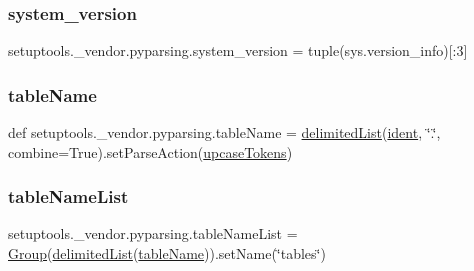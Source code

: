 \subsubsection{\texorpdfstring{system\+\_\+version}{system\_version}}
{\footnotesize\ttfamily setuptools.\+\_\+vendor.\+pyparsing.\+system\+\_\+version = tuple(sys.\+version\+\_\+info)\mbox{[}\+:3\mbox{]}}

\mbox{\label{namespacesetuptools_1_1__vendor_1_1pyparsing_a71a1a55915c50310d55220826e0ecf36}} 
\subsubsection{\texorpdfstring{table\+Name}{tableName}}
{\footnotesize\ttfamily def setuptools.\+\_\+vendor.\+pyparsing.\+table\+Name = \hyperlink{namespacesetuptools_1_1__vendor_1_1pyparsing_a1989367af98a82b6d6b4860de6b9f2f1}{delimited\+List}(\hyperlink{namespacesetuptools_1_1__vendor_1_1pyparsing_abc961dfe3e230ca908d9304d7786a03b}{ident}, \char`\"{}.\char`\"{}, combine=True).set\+Parse\+Action(\hyperlink{namespacesetuptools_1_1__vendor_1_1pyparsing_a9c65499f07d8593273a03109246a0065}{upcase\+Tokens})}

\mbox{\label{namespacesetuptools_1_1__vendor_1_1pyparsing_abf3681dc3179bcc2081feefd10f691e8}} 
\subsubsection{\texorpdfstring{table\+Name\+List}{tableNameList}}
{\footnotesize\ttfamily setuptools.\+\_\+vendor.\+pyparsing.\+table\+Name\+List = \hyperlink{classsetuptools_1_1__vendor_1_1pyparsing_1_1_group}{Group}(\hyperlink{namespacesetuptools_1_1__vendor_1_1pyparsing_a1989367af98a82b6d6b4860de6b9f2f1}{delimited\+List}(\hyperlink{namespacesetuptools_1_1__vendor_1_1pyparsing_a71a1a55915c50310d55220826e0ecf36}{table\+Name})).set\+Name(\char`\"{}tables\char`\"{})}

